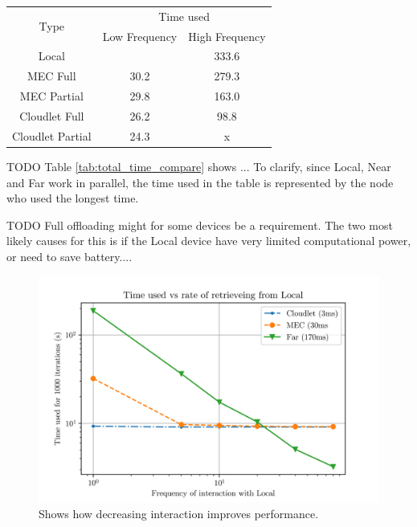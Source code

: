 \begin{table}[]
    \centering
    \begin{tabular}{|c|c|c|}
        \hline
        \multirow{2}{*}{Type} & \multicolumn{2}{c|}{Time used} \\ \cline{2-3}
         & Low Frequency & High Frequency         \\ \hline
        Local               &           &  333.6 \\ \hline
        MEC Full            &   30.2    &  279.3   \\ \hline
        MEC Partial         &   29.8    &  163.0       \\ \hline
        Cloudlet Full       &   26.2    &  98.8   \\ \hline
        Cloudlet Partial    &   24.3    &  x       \\ \hline
    \end{tabular}
\end{table}

TODO Table \ref{tab:total_time_compare} shows ... To clarify, since Local, Near and Far work in parallel, the time used in the table is represented by the node who used the longest time. 

TODO Full offloading might for some devices be a requirement. The two most likely causes for this is if the Local device have very limited computational power, or need to save battery....


\begin{figure}
    \centering
    \includegraphics{chapters/evaluation/figures/All_latency.png}
    \caption{Shows how decreasing interaction improves performance.}
    \label{fig:all_graph_decrease}
\end{figure}


